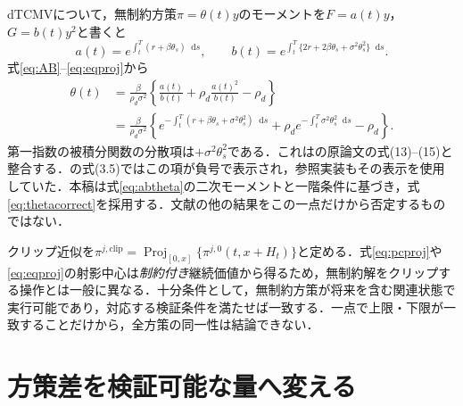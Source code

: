 \documentclass[11pt,a4paper]{article}
\numberwithin{equation}{section}
\numberwithin{table}{section}
\numberwithin{figure}{section}
\theoremstyle{plain}
\theoremstyle{definition}
\DeclareMathOperator{\Proj}{Proj}
\newcommand{\dd}{\mathop{}\!\mathrm{d}}
\begin{document}
dTCMVについて，無制約方策$\pi=\theta(t)y$のモーメントを$F=a(t)y$，$G=b(t)y^2$と書くと
\begin{equation}
a(t)=e^{\int_t^T(r+\beta\theta_s)\dd s},\qquad
b(t)=e^{\int_t^T\{2r+2\beta\theta_s+\sigma^2\theta_s^2\}\dd s}.
\label{eq:abtheta}
\end{equation}
式\eqref{eq:AB}--\eqref{eq:eqproj}から
\begin{align}
\theta(t)&=\frac\beta{\rho_d\sigma^2}\left\{\frac{a(t)}{b(t)}+
\rho_d\frac{a(t)^2}{b(t)}-\rho_d\right\}\label{eq:thetamon}\\
&=\frac\beta{\rho_d\sigma^2}\left\{
e^{-\int_t^T(r+\beta\theta_s+\sigma^2\theta_s^2)\dd s}
+\rho_d e^{-\int_t^T\sigma^2\theta_s^2\dd s}-\rho_d\right\}.
\label{eq:thetacorrect}
\end{align}
第一指数の被積分関数の分散項は\textbf{$+\sigma^2\theta_s^2$}である．これは\citet{BjorkMurgociZhou2014}の原論文の式(13)--(15)と整合する．\citet{vanStadenDangForsyth2021}の式(3.5)ではこの項が負号で表示され，参照実装もその表示を使用していた．本稿は式\eqref{eq:abtheta}の二次モーメントと一階条件に基づき，式\eqref{eq:thetacorrect}を採用する．文献の他の結果をこの一点だけから否定するものではない．

クリップ近似を$\pi^{j,\mathrm{clip}}=\Proj_{[0,x]}\{\pi^{j,0}(t,x+H_t)\}$と定める．式\eqref{eq:pcproj}や\eqref{eq:eqproj}の射影中心は\emph{制約付き}継続価値から得るため，無制約解をクリップする操作とは一般に異なる．十分条件として，無制約方策が将来を含む関連状態で実行可能であり，対応する検証条件を満たせば一致する．一点で上限・下限が一致することだけから，全方策の同一性は結論できない．

\FloatBarrier
\section{方策差を検証可能な量へ変える}
\label{sec:cert}
\end{document}
